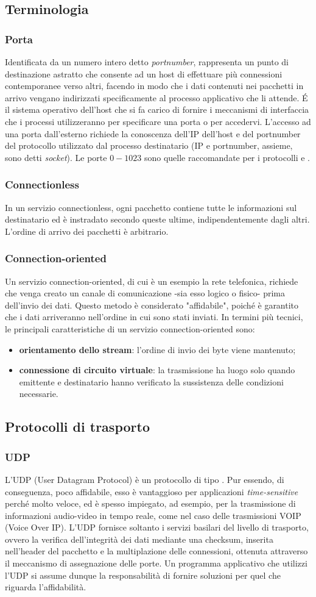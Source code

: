 \documentclass[a4paper,11pt]{article}
\def\sub#1{\subsection{#1}\label{#1}}
\def\subsub#1{\subsubsection{#1}\label{#1}}
\def\vedi#1{\nameref{#1}}
\begin{document}
\subsection{Terminologia}
\subsub{Porta} 
Identificata da un numero intero detto \textit{portnumber}, rappresenta un punto di destinazione astratto che consente ad un host di effettuare più connessioni contemporanee verso altri, facendo in modo che i dati contenuti nei pacchetti in arrivo vengano indirizzati specificamente al processo applicativo che li attende. \'E il sistema operativo dell'host che si fa carico di fornire i meccanismi di interfaccia che i processi utilizzeranno per specificare una porta o per accedervi. L'accesso ad una porta dall'esterno richiede la conoscenza dell'IP dell'host e del portnumber del protocollo utilizzato dal processo destinatario (IP e portnumber, assieme, sono detti \textit{socket}). Le porte $0-1023$ sono quelle raccomandate per i protocolli \vedi{TCP} e \vedi{UDP}.
\subsub{Connectionless}
In un servizio connectionless, ogni pacchetto contiene tutte le informazioni sul destinatario ed è instradato secondo queste ultime, indipendentemente dagli altri. L'ordine di arrivo dei pacchetti è arbitrario.
\subsub{Connection-oriented} 
Un servizio connection-oriented, di cui è un esempio la rete telefonica, richiede che venga creato un canale di comunicazione -sia esso logico o fisico- prima dell'invio dei dati. Questo metodo è considerato "affidabile", poiché è garantito che i dati arriveranno nell'ordine in cui sono stati inviati. In termini più tecnici, le principali caratteristiche di un servizio connection-oriented sono:
\begin{itemize}
\item \textbf{orientamento dello stream}: l'ordine di invio dei byte viene mantenuto;
\item \textbf{connessione di circuito virtuale}: la trasmissione ha luogo solo quando emittente e destinatario hanno verificato la sussistenza delle condizioni necessarie.
\end{itemize}

\sub{Protocolli di trasporto} 
\subsub{UDP} 
L'UDP (User Datagram Protocol) è un protocollo di tipo \vedi{Connectionless}. Pur essendo, di conseguenza, poco affidabile, esso è vantaggioso per applicazioni \textit{time-sensitive} perché molto veloce, ed è spesso impiegato, ad esempio, per la trasmissione di informazioni audio-video in tempo reale, come nel caso delle trasmissioni VOIP (Voice Over IP). L'UDP fornisce soltanto i servizi basilari del livello di trasporto, ovvero la verifica dell'integrità dei dati mediante una checksum, inserita nell'header del pacchetto e la multiplazione delle connessioni, ottenuta attraverso il meccanismo di assegnazione delle porte. Un programma applicativo che utilizzi l'UDP si assume dunque la responsabilità di fornire soluzioni per quel che riguarda l'affidabilità.
\end{document}
